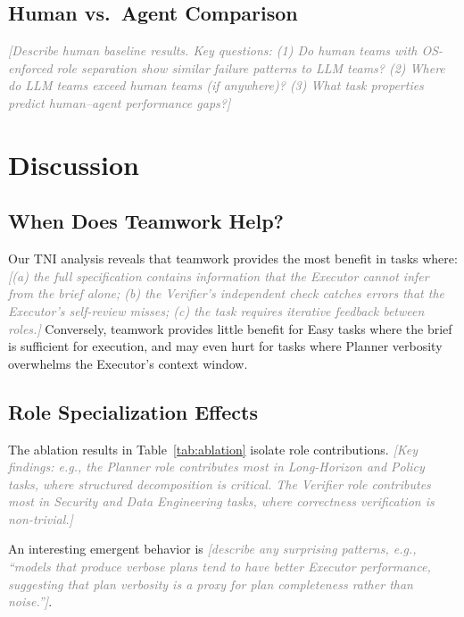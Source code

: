 \documentclass{article}
\newcommand{\tni}{\textsc{TNI}}
\newcommand{\placeholder}[1]{\textcolor{gray}{\textit{[#1]}}}
\begin{document}
\subsection{Human vs.\ Agent Comparison}
\label{sec:results:human}

\placeholder{Describe human baseline results. Key questions: (1) Do human
teams with OS-enforced role separation show similar failure patterns to LLM
teams? (2) Where do LLM teams exceed human teams (if anywhere)? (3) What
task properties predict human--agent performance gaps?}

\section{Discussion}
\label{sec:discussion}

\subsection{When Does Teamwork Help?}
\label{sec:discussion:when}

Our \tni{} analysis reveals that teamwork provides the most benefit in tasks
where: \placeholder{(a) the full specification contains information that the
Executor cannot infer from the brief alone; (b) the Verifier's independent
check catches errors that the Executor's self-review misses; (c) the task
requires iterative feedback between roles.} Conversely, teamwork provides
little benefit for Easy tasks where the brief is sufficient for execution,
and may even hurt for tasks where Planner verbosity overwhelms the Executor's
context window.

\subsection{Role Specialization Effects}
\label{sec:discussion:specialization}

The ablation results in Table~\ref{tab:ablation} isolate role contributions.
\placeholder{Key findings: e.g., the Planner role contributes most in
Long-Horizon and Policy tasks, where structured decomposition is critical.
The Verifier role contributes most in Security and Data Engineering tasks,
where correctness verification is non-trivial.}

An interesting emergent behavior is \placeholder{describe any surprising
patterns, e.g., ``models that produce verbose plans tend to have better
Executor performance, suggesting that plan verbosity is a proxy for plan
completeness rather than noise.''}.
\end{document}
